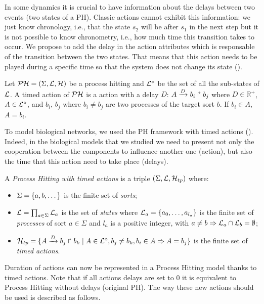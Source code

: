 In some dynamics it is crucial to have information about the delays between two events (two states of a PH). Classic actions cannot exhibit this information: we just know chronology, i.e., that the state $s_2$ will be after $s_1$ in the next step but it is not possible to know chronometry, i.e., how much time this transition takes to occur. We propose to add the delay in the action attributes which is responsable of the transition between the two states. That means that this action needs to be played during a specific time so that the system does not change its state ().

\begin{definition}
\label{def:TimedAction}
Let $\mathcal{PH} = (\Sigma,\mathcal{L},\mathcal{H})$ be a process hitting and $\mathcal{L}^{\diamond}$ be the set of all the sub-states of $\mathcal{L}$.
A timed action of $\mathcal{PH}$ is a action with a delay $D$: $A\xrightarrow{D} b_i \Rsh b_j$ where $D \in \mathds{R}^+$, $A \in \mathcal{L}^{\diamond}$, and $b_i$, $b_j$ where  $b_i \not = b_j$ are two processes of the target sort $b$. If $b_i \in A$, $A=b_i$.
\end{definition}
To model biological networks, we used the PH framework with timed actions (). Indeed, in the biological models that we studied we need to present not only the cooperation between the components to influence another one (action), but also the time that this action need to take place (delays). 
\begin{definition}
\label{def:PH-timed}
  A \emph{Process Hitting with timed actions} is a triple $(\Sigma,\mathcal{L},\mathcal{H}_{tp})$ where:
  \begin{itemize}
    \item  $\Sigma = \{a,b,\dots\}$ is the finite set of \emph{sorts};
    \item  $\mathcal{L} = \prod_{a\in\Sigma} \mathcal{L}_a$ is the set of \emph{states} where
      $\mathcal{L}_a = \{a_0,\dots,a_{l_a}\}$
      is the finite set of \emph{processes} of sort $a\in\Sigma$
      and $l_a$ is a positive integer, with $a\neq b\Rightarrow \mathcal{L}_a \cap \mathcal{L}_b = \emptyset$;
    \item  $\mathcal{H}_{tp} = \{ A\xrightarrow{D} b_j \Rsh b_k  \mid A \in \mathcal{L}^{\diamond}, b_j\neq b_k, b_i \in A \Rightarrow A=b_j\}$
      is the finite set of \emph{timed actions}.
  \end{itemize}
\end{definition}

Duration of actions can now be represented in a Process Hitting model thanks to timed actions.
Note that if all actions delays are set to 0 it is equivalent to Process Hitting without delays (original PH).
The way these new actions should be used is described as follows.

